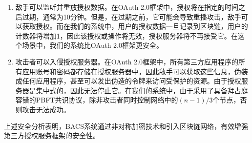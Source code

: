 \begin{enumerate}
  \item 敌手可以监听并重放授权数据。在OAuth 2.0框架中，授权将在指定的时间之后过期，通常为10分钟。但是，在过期之前，它可能会导致重播攻击，敌手可以获取授权。而在我们的系统中，用户的授权数据一旦记录到区块链，用户的计数器将增加1，因此该授权或操作将无效，授权服务器将不再接受它。在这个场景中，我们的系统比OAuth 2.0框架更安全。

  \item 攻击者可以入侵授权服务器。在OAuth 2.0框架中，所有第三方应用程序的所有应用账号和密码都存储在授权服务器中，因此敌手可以获取这些信息，伪装成任何应用程序，甚至可以发出伪造的令牌来访问受保护的资源。由于授权服务器是集中式的，因此无法停止它。在我们的系统中，由于采用了具备拜占庭容错的PBFT共识协议，除非攻击者同时控制网络中的$(n-1)/3$个节点，否则攻击无法成功。
\end{enumerate}

上述安全分析表明，BACS系统通过非对称加密技术和引入区块链网络，有效增强第三方授权服务框架的安全性。
